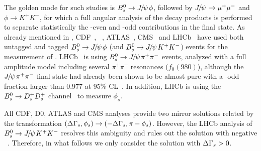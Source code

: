 The golden mode for such studies is 
$B^0_s \to {J\mskip -3mu/\mskip -2mu\psi\mskip 2mu}\phi$, followed by ${J\mskip -3mu/\mskip -2mu\psi\mskip 2mu} \to \mu^+\mu^-$ and 
$\phi\to K^+K^-$, for which a full angular 
analysis of the decay products is performed to 
separate statistically the \CP-even and \CP-odd
contributions in the final state. As already mentioned in 
,
CDF~\cite{Aaltonen:2012ie,*CDF:2011af,*Aaltonen:2007he_mod,*Aaltonen:2007gf_mod},
\dzero~\cite{Abazov:2011ry,*Abazov_mod:2008fj,*Abazov:2007tx_mod_cont},
ATLAS~\cite{Aad:2014cqa,*Aad:2012kba_cont}, CMS~\cite{CMS-PAS-BPH-13-012}
and LHCb~\cite{LHCB-PAPER-2014-059,*Aaij:2013oba_supersede2}
have used both untagged and tagged $B^0_s \to {J\mskip -3mu/\mskip -2mu\psi\mskip 2mu}\phi$ (and $B^0_s \to {J\mskip -3mu/\mskip -2mu\psi\mskip 2mu} K^+K^-$) events 
for the measurement of \phiccbars.
LHCb~\cite{Aaij:2014dka,*Aaij:2013oba_supersede}
is using $B^0_s \to {J\mskip -3mu/\mskip -2mu\psi\mskip 2mu} \pi^+\pi^-$ events, 
analyzed with a full amplitude model
including several $\pi^+\pi^-$ resonances (\eg $f_0(980)$),
although the
${J\mskip -3mu/\mskip -2mu\psi\mskip 2mu} \pi^+\pi^-$ final state had already been shown
to be almost \CP pure with a \CP-odd fraction
larger than 0.977 at 95\% CL~\cite{LHCb:2012ae}. 
In addition, LHCb is using the $B^0_s \to D^+_sD^+_s$ channel~\cite{Aaij:2014ywt} to measure $\phi_s$.

All CDF, D0, ATLAS and CMS analyses provide 
two mirror solutions related by the transformation 
$(\Delta\Gamma_{s}, \phi_s) \to (-\Delta\Gamma_{s}, \pi-\phi_s)$. However, the
LHCb analysis of $B^0_s \to {J\mskip -3mu/\mskip -2mu\psi\mskip 2mu} K^+K^-$ resolves this ambiguity and 
rules out the solution with negative \DGs~\cite{Aaij:2012eq}.
Therefore, in what follows we only consider the solution with $\Delta\Gamma_{s} > 0$.


